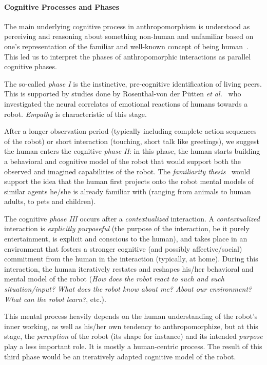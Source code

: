 \documentclass{sig-alternate-2013}
\begin{document}
\paragraph*{Cognitive Processes and Phases}

The main underlying cognitive process in anthropomorphism is understood as
perceiving and reasoning about something non-human and unfamiliar based on
one's representation of the familiar and well-known concept of being
human~\cite{epley_when_2008}. This led us to interpret the phases of
anthropomorphic interactions as parallel cognitive phases.

The so-called \emph{phase I} is the instinctive, pre-cognitive identification of
living peers. This is supported by studies done by Rosenthal-von der Pütten
\textit{et al.}~\cite{rosenthal-vonderputten_experimental_2013} who investigated
the neural correlates of emotional reactions of humans towards a robot. {\it
Empathy} is characteristic of this stage.

After a longer observation period (typically including complete action sequences
of the robot) or short interaction (touching, short talk like greetings), we
suggest the human enters the cognitive \emph{phase II}: in this phase, the human
starts building a behavioral and cognitive model of the robot that would support
both the observed and imagined capabilities of the robot.  The \emph{familiarity
thesis}~\cite{hegel_understanding_2008} would support the idea that the human
first projects onto the robot mental models of similar agents he/she is already
familiar with (ranging from animals to human adults, to pets and children).

The cognitive \emph{phase III} occurs after a \emph{contextualized} interaction.
A \emph{contextualized} interaction is \emph{explicitly purposeful} (the purpose
of the interaction, be it purely entertainment, is explicit and conscious to the
human), and takes place in an environment that fosters a stronger cognitive (and
possibly affective/social) commitment from the human in the interaction
(typically, at home). During this interaction, the human iteratively restates
and reshapes his/her behavioral and mental model of the robot (\emph{How does
the robot react to such and such situation/input?  What does the robot know
about me? About our environment? What can the robot learn?}, etc.).

This mental process heavily depends on the human understanding of the robot's
inner working, as well as his/her own tendency to anthropomorphize, but at this
stage, the \emph{perception} of the robot (its shape for instance) and its
intended \emph{purpose} play a less important role. It is mostly a human-centric
process.  The result of this third phase would be an iteratively adapted
cognitive model of the robot.
\end{document}
